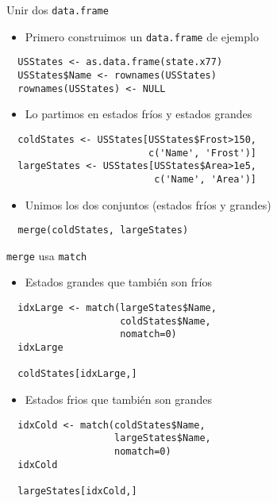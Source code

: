 \documentclass[xcolor={usenames,svgnames,dvipsnames}]{beamer}
\begin{document}
\begin{frame}[fragile,label=sec-4-2-7]{Unir dos \texttt{data.frame}}
 \begin{itemize}
\item Primero construimos un \texttt{data.frame} de ejemplo
\end{itemize}
\lstset{language=R,label= ,caption= ,numbers=none}
\begin{lstlisting}
  USStates <- as.data.frame(state.x77)
  USStates$Name <- rownames(USStates)
  rownames(USStates) <- NULL
\end{lstlisting}
\begin{itemize}
\item Lo partimos en estados \guillemotleft{}fríos\guillemotright{} y estados \guillemotleft{}grandes\guillemotright{}
\end{itemize}
\lstset{language=R,label= ,caption= ,numbers=none}
\begin{lstlisting}
  coldStates <- USStates[USStates$Frost>150,
                         c('Name', 'Frost')]
  largeStates <- USStates[USStates$Area>1e5,
                          c('Name', 'Area')]
\end{lstlisting}
\begin{itemize}
\item Unimos los dos conjuntos (estados \guillemotleft{}fríos\guillemotright{} y \guillemotleft{}grandes\guillemotright{})
\end{itemize}
\lstset{language=R,label= ,caption= ,numbers=none}
\begin{lstlisting}
  merge(coldStates, largeStates)
\end{lstlisting}
\end{frame}

\begin{frame}[fragile,label=sec-4-2-8]{\texttt{merge} usa \texttt{match}}
 \begin{itemize}
\item Estados grandes que también son fríos
\end{itemize}
\lstset{language=R,label= ,caption= ,numbers=none}
\begin{lstlisting}
  idxLarge <- match(largeStates$Name,
                    coldStates$Name,
                    nomatch=0)
  idxLarge
  
  coldStates[idxLarge,]
\end{lstlisting}

\begin{itemize}
\item Estados frios que también son grandes
\end{itemize}
\lstset{language=R,label= ,caption= ,numbers=none}
\begin{lstlisting}
  idxCold <- match(coldStates$Name,
                   largeStates$Name,
                   nomatch=0)
  idxCold
  
  largeStates[idxCold,]
\end{lstlisting}
\end{frame}
\end{document}
